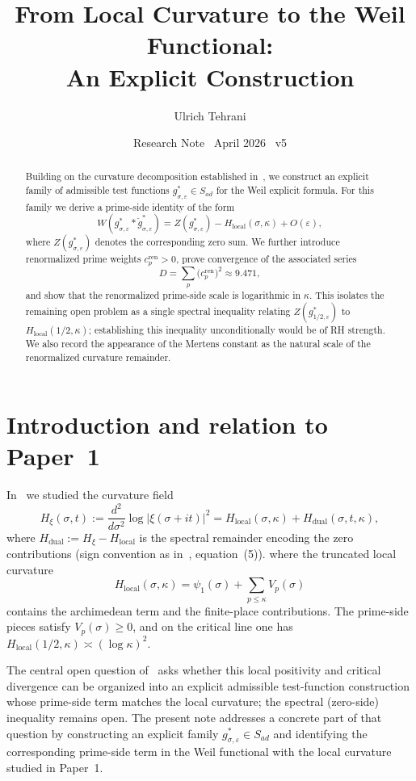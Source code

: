 \documentclass[11pt]{article}
\title{\vspace{-1.5em}\bfseries
From Local Curvature to the Weil Functional:\\[0.4em]
\large An Explicit Construction}
\author{Ulrich Tehrani}
\date{Research Note \textperiodcentered\ April 2026 \textperiodcentered\ v5}
\begin{document}
\maketitle

\begin{abstract}
Building on the curvature decomposition established in~\cite{paper1},
we construct an explicit family of admissible test functions
$g^*_{\sigma,\varepsilon} \in S_{ad}$ for the Weil explicit formula.
For this family we derive a prime-side identity of the form
\[
W(g^*_{\sigma,\varepsilon} * \check g^*_{\sigma,\varepsilon})
=
Z(g^*_{\sigma,\varepsilon}) - H_{\mathrm{local}}(\sigma,\kappa) + O(\varepsilon),
\]
where $Z(g^*_{\sigma,\varepsilon})$ denotes the corresponding zero sum.
We further introduce renormalized prime weights
$c_p^{\mathrm{ren}} > 0$, prove convergence of the associated series
\[
D = \sum_p \bigl(c_p^{\mathrm{ren}}\bigr)^2 \approx 9.471,
\]
and show that the renormalized prime-side scale is logarithmic in $\kappa$.
This isolates the remaining open problem as a single spectral inequality
relating $Z(g^*_{1/2,\varepsilon})$ to $H_{\mathrm{local}}(1/2,\kappa)$;
establishing this inequality unconditionally would be of RH strength.
We also record the appearance of the Mertens constant as the natural scale
of the renormalized curvature remainder.
\end{abstract}

\section{Introduction and relation to Paper~1}

In~\cite{paper1} we studied the curvature field
\[
H_{\xi}(\sigma,t)
:= \frac{d^2}{d\sigma^2}\log|\xi(\sigma+it)|^2
= H_{\mathrm{local}}(\sigma,\kappa) + H_{\mathrm{dual}}(\sigma,t,\kappa),
\]
where $H_{\mathrm{dual}} := H_{\xi} - H_{\mathrm{local}}$ is the spectral
remainder encoding the zero contributions (sign convention as in~\cite{paper1},
equation~(5)).
where the truncated local curvature
\[
H_{\mathrm{local}}(\sigma,\kappa) = \psi_1(\sigma)
+ \sum_{p\le\kappa} V_p(\sigma)
\]
contains the archimedean term and the finite-place contributions. The prime-side pieces satisfy
$V_p(\sigma) \ge 0$, and on the critical line one has
$H_{\mathrm{local}}(1/2,\kappa) \asymp (\log\kappa)^2$.

The central open question of~\cite[\S7]{paper1} asks whether this local
positivity and critical divergence can be organized into an explicit admissible
test-function construction whose prime-side term matches the local curvature;
the spectral (zero-side) inequality remains open. The present note addresses a
concrete part of that question by constructing an explicit family
$g^*_{\sigma,\varepsilon} \in S_{ad}$ and identifying the corresponding
prime-side term in the Weil functional with the local curvature studied in
Paper~1.
\end{document}
